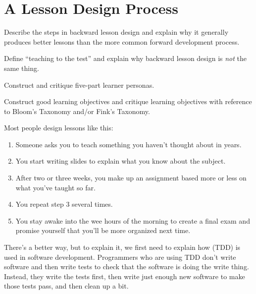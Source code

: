 \chapter{A Lesson Design Process}\label{s:process}

\begin{objectives}

\item Describe the steps in backward lesson design and explain why it
  generally produces better lessons than the more common forward
  development process.

\item Define ``teaching to the test'' and explain why backward lesson
  design is \emph{not} the same thing.

\item Construct and critique five-part learner personas.

\item Construct good learning objectives and critique learning
  objectives with reference to Bloom's Taxonomy and/or Fink's
  Taxonomy.

\end{objectives}

Most people design lessons like this:

\begin{enumerate}

\item
  Someone asks you to teach something you haven't thought about in
  years.

\item
  You start writing slides to explain what you know about the subject.

\item
  After two or three weeks, you make up an assignment based more or
  less on what you've taught so far.

\item
  You repeat step 3 several times.

\item
  You stay awake into the wee hours of the morning to create a final
  exam and promise yourself that you'll be more organized next time.

\end{enumerate}

There's a better way, but to explain it, we first need to explain how
 (TDD) is
used in software development. Programmers who are using TDD don't
write software and then write tests to check that the software is
doing the write thing. Instead, they write the tests first, then write
just enough new software to make those tests pass, and then clean up a
bit.

